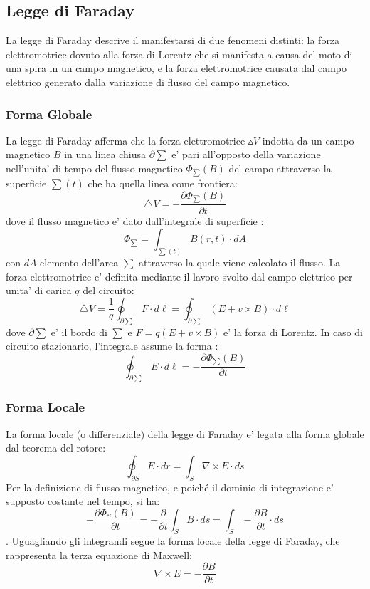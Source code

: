 \documentclass[a4paper, 10pt]{article}
\begin{document}
		\subsection{Legge di Faraday}
			La legge di Faraday descrive il manifestarsi di due fenomeni distinti: la forza elettromotrice dovuto alla 
			forza di Lorentz che si manifesta a causa del moto di una spira in un campo magnetico, 
			e la forza elettromotrice causata dal campo elettrico generato dalla variazione di flusso del campo magnetico.
			\subsubsection{Forma Globale}
				La legge di Faraday afferma che la forza elettromotrice $\vartriangle V$ indotta da un campo magnetico $B$
				in una linea chiusa $\partial \sum$ e' pari all'opposto della variazione nell'unita' di tempo del flusso
				magnetico $\Phi_{\sum} (B)$ del campo attraverso la superficie $\sum (t)$ che ha quella linea come frontiera:
				\[ \triangle V = - \frac{\partial \Phi_{\sum} (B)}{\partial t} \] dove il flusso magnetico 
				e' dato dall'integrale
				di superficie :
				\[ \Phi_{\sum} = \int_{\sum (t)} B(r,t) \cdot dA \] con $dA$ elemento dell'area $\sum$ attraverso la quale viene 
				calcolato il flusso. La forza elettromotrice e' definita mediante il lavoro svolto dal campo elettrico per unita'
				di carica $q$ del circuito:
				\[ \triangle V = \frac{1}{q} \oint_{\partial \sum} F \cdot d\ell = \oint_{\partial \sum} (E + v \times B) \cdot 
				d \ell \] dove $\partial \sum$ e' il bordo di $\sum$ e $F = q(E + v \times B)$ e' la forza di Lorentz. In caso di
				circuito stazionario, l'integrale assume la forma :
				\[ \oint_{\partial \sum } E \cdot d\ell = -\frac{\partial \Phi_{\sum} (B)}{\partial t} \]
			\subsubsection{Forma Locale}
				La forma locale (o differenziale) della legge di Faraday e' legata alla forma globale dal teorema del rotore:
				\[ \oint_{\partial S} E \cdot dr = \int_S \nabla \times E \cdot ds \]
				Per la definizione di flusso magnetico, e poiché il dominio di integrazione e' supposto costante nel tempo, si ha:
				\[ -\frac{\partial \Phi_{S} (B)}{\partial t} = -\frac{\partial}{\partial t} \int_S B \cdot ds = \int_S -
				\frac{\partial B}{\partial t} \cdot ds \]. Uguagliando gli integrandi segue la forma locale della legge di Faraday,
				che rappresenta la terza equazione di Maxwell:
				\[ \nabla \times E = -\frac{\partial B}{\partial t} \]
\end{document}
